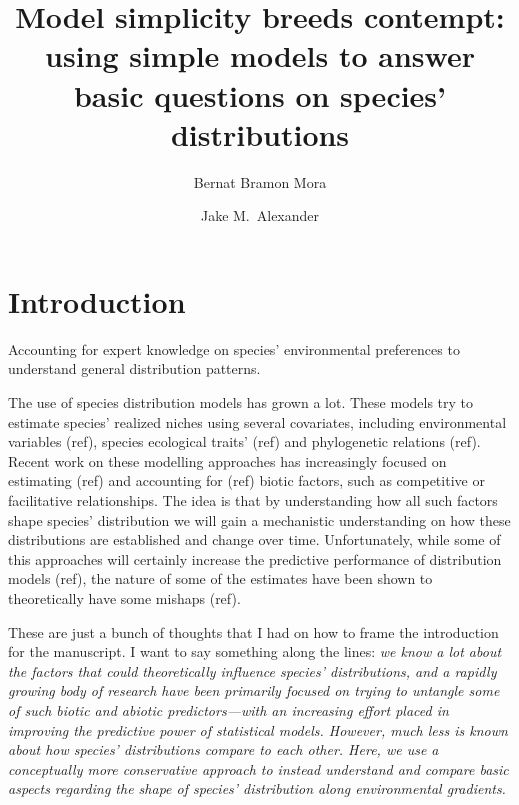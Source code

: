 \documentclass[11pt, a4paper]{article}
\title{\vspace{-1cm}
Model simplicity breeds contempt: using simple models to answer basic questions on species' distributions}
\author[1,*]{\normalsize Bernat Bramon Mora}
\author[1]{\normalsize Jake M.\ Alexander}
\affil[1]{\footnotesize Institute of Integrative Biology, ETH Zürich, Zürich, Switzerland}
\affil[*]{\footnotesize  bernat.bramon@gmail.com}
\date{}
\begin{document}
\maketitle
\linenumbers
\section*{Introduction}
Accounting for expert knowledge on species' environmental preferences to understand general distribution patterns.

The use of species distribution models has grown a lot. These models try to estimate species' realized niches using several covariates, including environmental variables (ref), species ecological traits' (ref) and phylogenetic relations (ref). Recent work on these modelling approaches has increasingly focused on estimating (ref) and accounting for (ref) biotic factors, such as competitive or facilitative relationships. The idea is that by understanding how all such factors shape species' distribution we will gain a mechanistic understanding on how these distributions are established and change over time. Unfortunately, while some of this approaches will certainly increase the predictive performance of distribution models (ref), the nature of some of the estimates have been shown to theoretically have some mishaps (ref).

{\color{gray}
These are just a bunch of thoughts that I had on how to frame the introduction for the manuscript. I want to say something along the lines: \textit{we know a lot about the factors that could theoretically influence species' distributions, and a rapidly growing body of research have been primarily focused on trying to untangle some of such biotic and abiotic predictors---with an increasing effort placed in improving the predictive power of statistical models. However, much less is known about how species' distributions compare to each other. Here, we use a conceptually more conservative approach to instead understand and compare basic aspects regarding the shape of species' distribution along environmental gradients.}}
\end{document}
